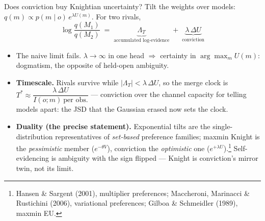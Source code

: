 \documentclass[aspectratio=169,11pt]{beamer}
\begin{document}
\begin{frame}{Does conviction buy Knightian uncertainty?}
  Tilt the weights over models: $q(m) \propto p(m \mid o)\, e^{\lambda U(m)}$.
  For two rivals,
  \[
    \log\frac{q(M_1)}{q(M_2)} \;=\;
    \underbrace{\Lambda_T}_{\text{accumulated log-evidence}}
    \;+\; \underbrace{\lambda\,\Delta U}_{\text{conviction}}
  \]
  \vspace{-0.4em}
  \begin{itemize}\small
    \item \alert{The naive limit fails.} $\lambda \to \infty$ in one head
      $\Rightarrow$ certainty in $\arg\max_m U(m)$: \alert{dogmatism}, the
      opposite of held-open ambiguity.
    \item \textbf{Timescale.} Rivals survive while
      $|\Lambda_T| < \lambda\,\Delta U$, so the merge clock is
      $T^{\ast} \approx \dfrac{\lambda\,\Delta U}{I(o;m)\ \text{per obs.}}$
      --- conviction over the channel capacity for telling models apart:
      the JSD that the Gaussian erased now sets the clock.
    \item \textbf{Duality (the precise statement).} Exponential tilts are the
      single-distribution representatives of \emph{set-based} preference
      families; maxmin Knight is the \emph{pessimistic} member
      ($e^{-\theta V}$), conviction the \emph{optimistic} one
      ($e^{+\lambda U}$).\footnote[frame]{\tiny Hansen \& Sargent (2001),
      multiplier preferences; Maccheroni, Marinacci \& Rustichini (2006),
      variational preferences; Gilboa \& Schmeidler (1989), maxmin EU.}
      \alert{Self-evidencing is ambiguity with the sign flipped} --- Knight is
      conviction's mirror twin, not its limit.
  \end{itemize}
\end{frame}
\end{document}
